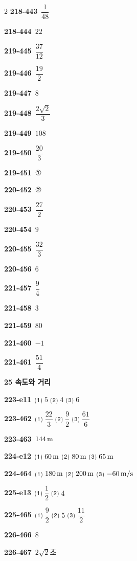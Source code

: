 \documentclass[10pt,a4paper]{article}
\begin{document}
\begin{multicols}{2}
\noindent\textbf{218-443}\ $\dfrac{1}{48}$\par
\noindent\textbf{218-444}\ $22$\par
\noindent\textbf{219-445}\ $\dfrac{37}{12}$\par
\noindent\textbf{219-446}\ $\dfrac{19}{2}$\par
\noindent\textbf{219-447}\ $8$\par
\noindent\textbf{219-448}\ $\dfrac{2\sqrt{2}}{3}$\par
\noindent\textbf{219-449}\ $108$\par
\noindent\textbf{219-450}\ $\dfrac{20}{3}$\par
\noindent\textbf{219-451}\ ①\par
\noindent\textbf{220-452}\ ②\par
\noindent\textbf{220-453}\ $\dfrac{27}{2}$\par
\noindent\textbf{220-454}\ $9$\par
\noindent\textbf{220-455}\ $\dfrac{32}{3}$\par
\noindent\textbf{220-456}\ $6$\par
\noindent\textbf{221-457}\ $\dfrac{9}{4}$\par
\noindent\textbf{221-458}\ $3$\par
\noindent\textbf{221-459}\ $80$\par
\noindent\textbf{221-460}\ $-1$\par
\noindent\textbf{221-461}\ $\dfrac{51}{4}$\par
\noindent\textbf{25 속도와 거리}\par\smallskip
\noindent\textbf{223-e11}\ ⑴ $5$ ⑵ $4$ ⑶ $6$\par
\noindent\textbf{223-462}\ ⑴ $\dfrac{22}{3}$ ⑵ $\dfrac{9}{2}$ ⑶ $\dfrac{61}{6}$\par
\noindent\textbf{223-463}\ $144\mkern3mu \mathrm{m}$\par
\noindent\textbf{224-e12}\ ⑴ $60\mkern3mu \mathrm{m}$ ⑵ $80\mkern3mu \mathrm{m}$ ⑶ $65\mkern3mu \mathrm{m}$\par
\noindent\textbf{224-464}\ ⑴ $180\mkern3mu \mathrm{m}$ ⑵ $200\mkern3mu \mathrm{m}$ ⑶ $-60\mkern3mu \mathrm{m/s}$\par
\noindent\textbf{225-e13}\ ⑴ $\dfrac{1}{2}$ ⑵ $4$\par
\noindent\textbf{225-465}\ ⑴ $\dfrac{9}{2}$ ⑵ $5$ ⑶ $\dfrac{11}{2}$\par
\noindent\textbf{226-466}\ $8$\par
\noindent\textbf{226-467}\ $2\sqrt{2}$초\par

\end{multicols}
\end{document}
